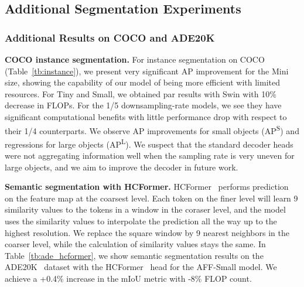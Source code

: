 \documentclass[10pt,twocolumn,letterpaper]{article}
\begin{document}
\subsection{Additional Segmentation Experiments}

\subsubsection{Additional Results on COCO and ADE20K}



\textbf{COCO instance segmentation.} For instance segmentation on COCO (Table~\ref{tb:instance}), we present very significant AP improvement for  the Mini size, showing the capability of our model of being more efficient with limited resources. For Tiny and Small, we obtained par results with Swin with 10\% decrease in FLOPs. For the 1/5 downsampling-rate models, we see they have significant computational benefits with little performance drop with respect to their 1/4 counterparts. 
We observe AP improvements for small objects (AP\textsuperscript{S}) and regressions for large objects (AP\textsuperscript{L}). We suspect that the standard decoder heads were not aggregating information well when the sampling rate is very uneven for large objects, and we aim to improve the decoder in future work.

\textbf{Semantic segmentation with HCFormer.} HCFormer~\cite{hcformer} performs prediction on the feature map at the coarsest level. Each token on the finer level will learn 9 similarity values to the tokens in a  window in the coraser level, and the model uses the similarity values to interpolate the prediction all the way up to the highest resolution. We replace the square window by 9 nearest neighbors in the coarser level, while the calculation of similarity values stays the same. 
In Table~\ref{tb:ade_hcformer}, we show semantic segmentation results on the ADE20K~\cite{ade} dataset with the HCFormer~\cite{hcformer} head for the AFF-Small model. We achieve a +0.4\% increase in the mIoU metric with -8\% FLOP count.
\end{document}
